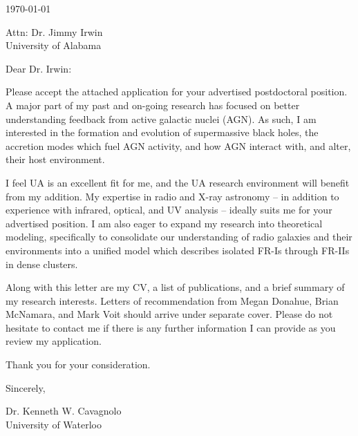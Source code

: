 \documentclass[11pt]{article}
\begin{document}
\today

Attn: Dr. Jimmy Irwin\\
University of Alabama

Dear Dr. Irwin:

Please accept the attached application for your advertised
postdoctoral position. A major part of my past and on-going research
has focused on better understanding feedback from active galactic
nuclei (AGN). As such, I am interested in the formation and evolution
of supermassive black holes, the accretion modes which fuel AGN
activity, and how AGN interact with, and alter, their host
environment.

I feel UA is an excellent fit for me, and the UA research environment
will benefit from my addition. My expertise in radio and X-ray
astronomy -- in addition to experience with infrared, optical, and UV
analysis -- ideally suits me for your advertised position. I am also
eager to expand my research into theoretical modeling, specifically to
consolidate our understanding of radio galaxies and their environments
into a unified model which describes isolated FR-Is through FR-IIs in
dense clusters.

Along with this letter are my CV, a list of publications, and a brief
summary of my research interests. Letters of recommendation from Megan
Donahue, Brian McNamara, and Mark Voit should arrive under separate
cover. Please do not hesitate to contact me if there is any further
information I can provide as you review my application.

Thank you for your consideration.

Sincerely,\\
\begin{minipage}{7.5in}
\end{minipage}
Dr. Kenneth W. Cavagnolo\\
University of Waterloo
\end{document}
